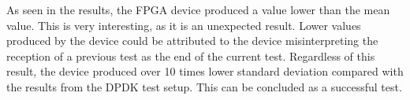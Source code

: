 \par As seen in the results, the FPGA device produced a value lower than the mean value. This is very interesting, as
it is an unexpected result. Lower values produced by the device could be attributed to the device misinterpreting 
the reception of a previous test as the end of the current test. Regardless of this result, the device produced over 
10 times lower standard deviation compared with the results from the DPDK test setup. This can be concluded as a 
successful test.
